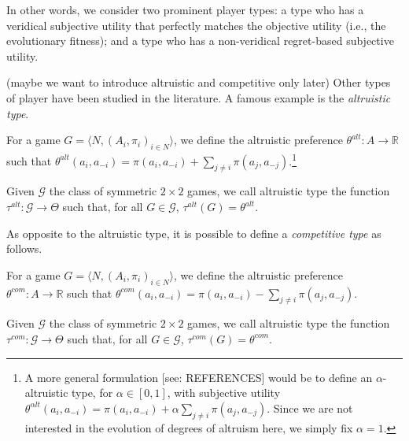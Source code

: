 \documentclass[fleqn,reqno,11pt]{article}
\begin{document}
\noindent In other words, we consider two prominent player types: a type who has a veridical subjective utility that perfectly matches the objective utility (i.e., the evolutionary fitness); and a type who has a non-veridical regret-based subjective utility. 

\iffalse
(maybe we want to introduce altruistic and competitive only later) Other types of player have been studied in the literature. A famous example is the \textit{altruistic type}.

\begin{definition} \label{defn:altpref}

For a game $ G=\langle N, (A_i , \pi_i)_{i \in N} \rangle $, we define the altruistic preference $ \theta^{alt}: A \rightarrow \mathbb{R} $ such that $ \theta^{alt}(a_i,a_{-i})=\pi(a_i,a_{-i}) + \sum_{j \neq i} \pi(a_{j},a_{-j})$.\footnote{A more general formulation [see: REFERENCES] would be to define an $ \alpha$-altruistic type, for $\alpha \in [0,1]$, with subjective utility $ \theta^{\alpha lt}(a_i,a_{-i})=\pi(a_i,a_{-i}) + \alpha \sum_{j \neq i} \pi(a_{j},a_{-j})$. Since we are not interested in the evolution of degrees of altruism here, we simply fix $ \alpha = 1 $.}

\end{definition}

\begin{definition} \label{defn:alttype}

Given $ \mathcal{G} $ the class of symmetric $ 2 \times 2 $ games, we call altruistic type the function $\tau^{alt}: \mathcal{G} \rightarrow  \Theta$ such that, for all $G \in \mathcal{G}$, $ \tau^{alt}(G)= \theta^{alt}$.

\end{definition}

\noindent As opposite to the altruistic type, it is possible to define a \textit{competitive type} as follows. 

\begin{definition} \label{defn:compref}

For a game $ G=\langle N, (A_i , \pi_i)_{i \in N} \rangle $, we define the altruistic preference $ \theta^{com}: A \rightarrow \mathbb{R} $ such that $ \theta^{com}(a_i,a_{-i})=\pi(a_i,a_{-i}) - \sum_{j \neq i} \pi(a_{j},a_{-j})$.

\end{definition}

\begin{definition} \label{defn:comtype}

Given $ \mathcal{G} $ the class of symmetric $ 2 \times 2 $ games, we call altruistic type the function $\tau^{com}: \mathcal{G} \rightarrow  \Theta$ such that, for all $G \in \mathcal{G}$, $ \tau^{com}(G)= \theta^{com}$.

\end{definition}
\end{document}
